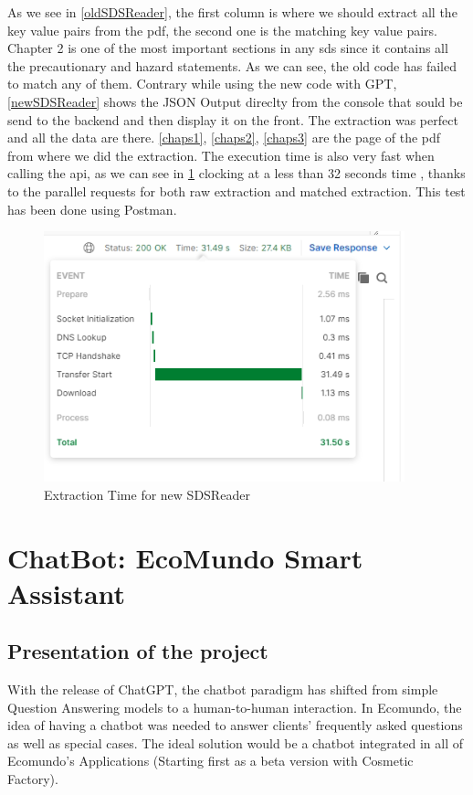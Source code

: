 \documentclass[a4paper,12pt,twoside]{report}
\begin{document}
As we see in \ref{oldSDSReader}, the first column is where we should extract all the key value pairs from the pdf, the second one is the matching key value pairs. Chapter 2 is one of the most important sections in any sds since it contains all the precautionary and hazard statements. As we can see, the old code has failed to match any of them.
Contrary while using the new code with GPT, \ref{newSDSReader} shows the JSON Output direclty from the console that sould be send to the backend and then display it on the front. The extraction was perfect and all the data are there. \ref{chaps1}, \ref{chaps2}, \ref{chaps3} are the page of the pdf from where we did the extraction.
The execution time is also very fast when calling the api, as we can see in \ref{sdsTimeResponse} clocking at a less than 32 seconds time , thanks to the parallel requests for both raw extraction and matched extraction. This test has been done using Postman.
\begin{figure}[H]
		\includegraphics[width=\textwidth, keepaspectratio ]{images/sdsTimeResponse}
	\caption[sdsTimeResponse]{Extraction Time for new SDSReader}
\label{sdsTimeResponse}
\end{figure}	

\section{ChatBot: EcoMundo Smart Assistant}\label{chatbot}
\subsection{Presentation of the project}
With the release of ChatGPT, the chatbot paradigm has shifted from simple Question Answering models to a human-to-human interaction. 
In Ecomundo, the idea of having a chatbot was needed to answer clients' frequently asked questions as well as special cases. The ideal solution would be a chatbot integrated in all of Ecomundo's Applications (Starting first as a beta version with Cosmetic Factory).
\end{document}
